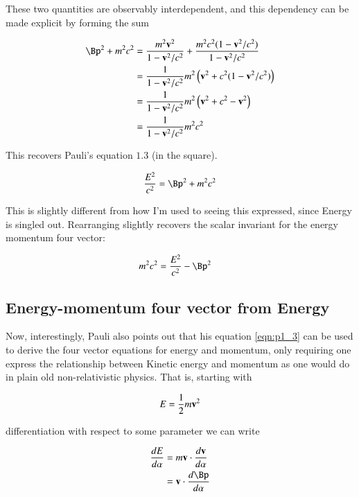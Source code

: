 \documentclass{article}
\begin{document}
These two quantities are observably interdependent, and this dependency can be made explicit by forming the sum

\begin{align*}
\Bp^2 + m^2 c^2 
&= \frac{ m^2 \Bv^2 }{{1 - \Bv^2/c^2}} +  \frac{ m^2 c^2( 1 - \Bv^2/c^2) }{{1 - \Bv^2/c^2}}  \\
&= \inv{1 - \Bv^2/c^2} m^2 \left( \Bv^2 + c^2( 1 - \Bv^2/c^2) \right) \\
&= \inv{1 - \Bv^2/c^2} m^2 \left( \Bv^2 + c^2 - \Bv^2 \right) \\
&= \inv{1 - \Bv^2/c^2} m^2 c^2 \\
\end{align*}

This recovers Pauli's equation $1.3$ (in the square).

\begin{align}\label{eqn:p1_3}
\frac{E^2}{c^2} = \Bp^2 + m^2 c^2 
\end{align}

This is slightly different from how I'm used to seeing this expressed, since Energy is singled out.
Rearranging slightly recovers the scalar invariant for the energy momentum four vector:

\begin{align*}
m^2 c^2 &= \frac{E^2}{c^2} -\Bp^2 
\end{align*}

\subsection{ Energy-momentum four vector from Energy }

Now, interestingly, Pauli also points out that his equation \ref{eqn:p1_3} can be used to derive the four vector
equations for energy and momentum, only requiring one express the relationship between Kinetic energy and momentum
as one would do in plain old non-relativistic physics.  That is, starting with

\begin{align*}
E &= \frac{1}{2} m \mathbf{v}^2 \\
\end{align*}

differentiation with respect to some parameter we can write

\begin{align*}
\frac{dE}{d\alpha} 
&= m \Bv \cdot \frac{d\Bv}{d\alpha} \\
&= \Bv \cdot \frac{d\Bp}{d\alpha} \\
\end{align*}
\end{document}
